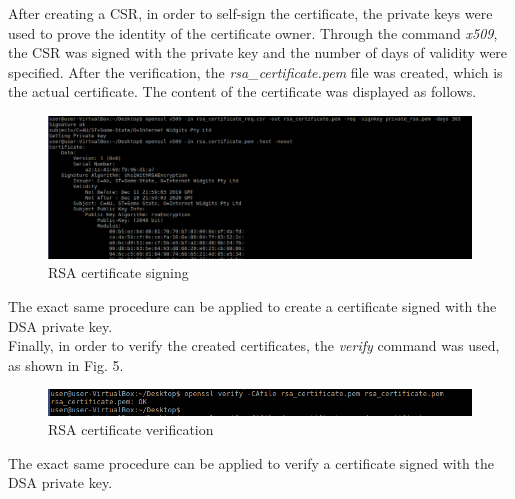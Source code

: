 \documentclass[11pt]{article}
\begin{document}
After creating a CSR, in order to self-sign the certificate, the private keys were used to prove the identity of the certificate owner. Through the command \textit{x509}, the CSR was signed with the private key and the number of days of validity were specified. After the verification, the \textit{rsa\_certificate.pem} file was created, which is the actual certificate. The content of the certificate was displayed as follows.\\

\begin{figure}[H]
	\includegraphics[width=1\textwidth]{img5-hw6-1743261.png}
	\caption{RSA certificate signing}
\end{figure}

The exact same procedure can be applied to create a certificate signed with the DSA private key.\\
Finally, in order to verify the created certificates, the \textit{verify} command was used, as shown in Fig. 5.

\begin{figure}[H]
	\includegraphics[width=1\textwidth]{img6-hw6-1743261.png}
	\caption{RSA certificate verification}
\end{figure}
\clearpage
The exact same procedure can be applied to verify a certificate signed with the DSA private key.\\
\end{document}
